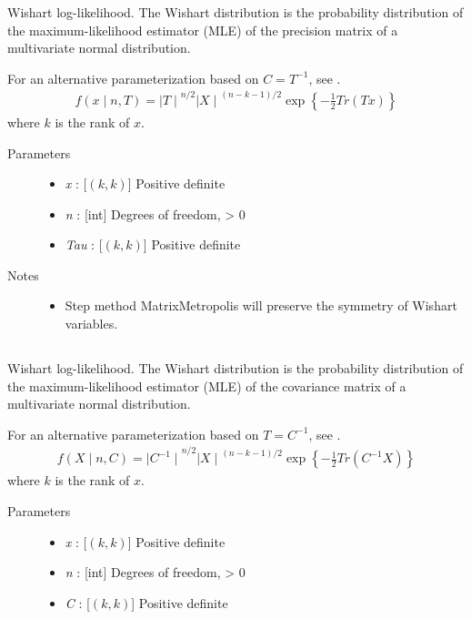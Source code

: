 \documentclass[]{jss}
\begin{document}
Wishart log-likelihood. The Wishart distribution is the probability
distribution of the maximum-likelihood estimator (MLE) of the precision
matrix of a multivariate normal distribution.

For an alternative parameterization based on $C=T^{-1}$, see
.
\begin{eqnarray*}
f(x \mid n, T) = {\mid T \mid}^{n/2}{\mid X \mid}^{(n-k-1)/2} \exp\left\{ -\frac{1}{2} Tr(Tx) \right\}    
\end{eqnarray*}
where $k$ is the rank of $x$.
\begin{description}
\item[Parameters] \leavevmode\begin{itemize}
\item {} 
\emph{x} : [$(k,k)$] Positive definite

\item{} 
\emph{n} : [int] Degrees of freedom, \textgreater{} 0

\item{}
\emph{Tau} : [$(k,k)$] Positive definite

\end{itemize}

\item[Notes]\leavevmode
\begin{itemize}
    \item {}
    Step method MatrixMetropolis will preserve the symmetry of Wishart variables.
\end{itemize}

\end{description}



\subsection[Wishart, covariance parameterization]{ }

Wishart log-likelihood. The Wishart distribution is the probability
distribution of the maximum-likelihood estimator (MLE) of the covariance
matrix of a multivariate normal distribution.

For an alternative parameterization based on $T=C^{-1}$, see
.
\begin{eqnarray*}
f(X \mid n, C) = {\mid C^{-1} \mid}^{n/2}{\mid X \mid}^{(n-k-1)/2} \exp\left\{ -\frac{1}{2} Tr(C^{-1}X) \right\}    
\end{eqnarray*}
where $k$ is the rank of $x$.
\begin{description}
\item[Parameters] \leavevmode\begin{itemize}
\item{}
\emph{x} : [$(k,k)$] Positive definite

\item{}
\emph{n} : [int] Degrees of freedom, \textgreater{} 0

\item{}
\emph{C} : [$(k,k)$] Positive definite

\end{itemize}

\end{description}
\normalsize


\newpage

\nocite{Bernardo:1992fk}

\end{document}

